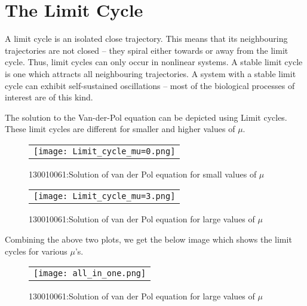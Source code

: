 \documentclass[12pt, a4paper]{report}
\begin{document}
\chapter{The Limit Cycle}
A limit cycle is an isolated close trajectory. This means that its neighbouring trajectories are not closed – they spiral either towards or away from the limit cycle. Thus, limit cycles can only occur in nonlinear systems. A stable limit cycle is one which attracts all
neighbouring trajectories. A system with a stable limit cycle can exhibit self-sustained oscillations – most of the biological processes of interest are of this kind.

The solution to the Van-der-Pol equation can be depicted using Limit cycles. These limit cycles are different for smaller and higher values of $\mu$. 

\begin{figure}[H]
	\centering
	\begin{tabular} {l}
	\texttt{[image: Limit\_cycle\_mu=0.png]} 
	\end{tabular}
	\caption{130010061:Solution of van der Pol equation for small values of $\mu$}
\end{figure}
\label{fig6} 

\begin{figure}[H]
	\centering
	\begin{tabular} {l}
	\texttt{[image: Limit\_cycle\_mu=3.png]} 
	\end{tabular}
	\caption{130010061:Solution of van der Pol equation for large values of $\mu$}
\end{figure}
\label{fig7}

Combining the above two plots, we get the below image which shows the limit cycles for various  $\mu$'s.\cite{belur}
\begin{figure}[H]
	\centering
	\begin{tabular} {l}
	\texttt{[image: all\_in\_one.png]} 
	\end{tabular}
	\caption{130010061:Solution of van der Pol equation for large values of $\mu$}
\end{figure}
\label{fig8}
\end{document}
